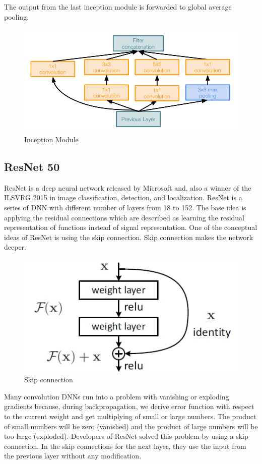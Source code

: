 \documentclass[titlepage]{report}
\begin{document}
The output from the last inception module is forwarded to global average pooling.

\begin{figure}[h!]
    \centering
    \includegraphics[scale=0.4]{googlenet}
    \caption{Inception Module}
\end{figure}

\subsection{ResNet 50}
ResNet is a deep neural network released by Microsoft and, also a winner of the ILSVRG 2015 in image classification, detection, and localization. ResNet is a series of DNN with different number of layers from 18 to 152. The base idea is applying the residual connections which are described as learning the residual representation of functions instead of signal representation. One of the conceptual ideas of ResNet is using the skip connection. Skip connection makes the network deeper.  
\begin{figure}[h!]
    \centering
    \includegraphics[scale=0.4]{resnet_1}
    \caption{Skip connection}
\end{figure}

Many convolution DNNs run into a problem with vanishing or exploding gradients because, during backpropagation, we derive error function with respect to the current weight and get multiplying of small or large numbers. The product of small numbers will be zero (vanished) and the product of large numbers will be too large (exploded). Developers of ResNet solved this problem by using a skip connection. In the skip connections for the next layer, they use the input from the previous layer without any modification. 
\end{document}
